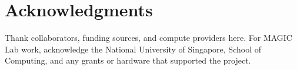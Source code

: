 \section*{Acknowledgments}
\label{sec:ack}

Thank collaborators, funding sources, and compute providers here. For MAGIC Lab
work, acknowledge the National University of Singapore, School of Computing, and
any grants or hardware that supported the project.
